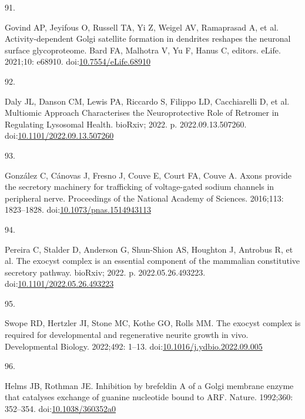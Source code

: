 \documentclass[
  12pt,
  a4paper,
]{book}
\newlength{\cslhangindent}
\newlength{\csllabelwidth}
\newlength{\cslentryspacingunit} %
\newenvironment{CSLReferences}[2] %
 {%
  \setlength{\parindent}{0pt}
  \ifodd #1
  \let\oldpar\par
  \def\par{\hangindent=\cslhangindent\oldpar}
  \fi
  \setlength{\parskip}{#2\cslentryspacingunit}
 }%
 {}
\newcommand{\CSLLeftMargin}[1]{\parbox[t]{\csllabelwidth}{#1}}
\newcommand{\CSLRightInline}[1]{\parbox[t]{\linewidth - \csllabelwidth}{#1}\break}
\begin{document}
\begin{CSLReferences}{0}{0}
\leavevmode{}%
\CSLLeftMargin{91. }%
\CSLRightInline{Govind AP, Jeyifous O, Russell TA, Yi Z, Weigel AV, Ramaprasad A, et al. Activity-dependent {Golgi} satellite formation in dendrites reshapes the neuronal surface glycoproteome. Bard FA, Malhotra V, Yu F, Hanus C, editors. eLife. 2021;10: e68910. doi:\href{https://doi.org/10.7554/eLife.68910}{10.7554/eLife.68910}}

\leavevmode{}%
\CSLLeftMargin{92. }%
\CSLRightInline{Daly JL, Danson CM, Lewis PA, Riccardo S, Filippo LD, Cacchiarelli D, et al. Multiomic {Approach Characterises} the {Neuroprotective Role} of {Retromer} in {Regulating Lysosomal Health}. {bioRxiv}; 2022. p. 2022.09.13.507260. doi:\href{https://doi.org/10.1101/2022.09.13.507260}{10.1101/2022.09.13.507260}}

\leavevmode{}%
\CSLLeftMargin{93. }%
\CSLRightInline{González C, Cánovas J, Fresno J, Couve E, Court FA, Couve A. Axons provide the secretory machinery for trafficking of voltage-gated sodium channels in peripheral nerve. Proceedings of the National Academy of Sciences. 2016;113: 1823--1828. doi:\href{https://doi.org/10.1073/pnas.1514943113}{10.1073/pnas.1514943113}}

\leavevmode{}%
\CSLLeftMargin{94. }%
\CSLRightInline{Pereira C, Stalder D, Anderson G, Shun-Shion AS, Houghton J, Antrobus R, et al. The exocyst complex is an essential component of the mammalian constitutive secretory pathway. {bioRxiv}; 2022. p. 2022.05.26.493223. doi:\href{https://doi.org/10.1101/2022.05.26.493223}{10.1101/2022.05.26.493223}}

\leavevmode{}%
\CSLLeftMargin{95. }%
\CSLRightInline{Swope RD, Hertzler JI, Stone MC, Kothe GO, Rolls MM. The exocyst complex is required for developmental and regenerative neurite growth in vivo. Developmental Biology. 2022;492: 1--13. doi:\href{https://doi.org/10.1016/j.ydbio.2022.09.005}{10.1016/j.ydbio.2022.09.005}}

\leavevmode{}%
\CSLLeftMargin{96. }%
\CSLRightInline{Helms JB, Rothman JE. Inhibition by brefeldin {A} of a {Golgi} membrane enzyme that catalyses exchange of guanine nucleotide bound to {ARF}. Nature. 1992;360: 352--354. doi:\href{https://doi.org/10.1038/360352a0}{10.1038/360352a0}}


\end{CSLReferences}
\end{document}
